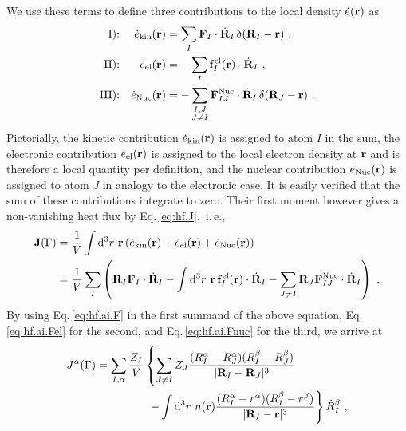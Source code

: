We use these terms to define three contributions to the local density $\dot{e} ({\bf r})$ as
\begin{subequations}
\begin{align}
	\text{I):}&&
		\dot{e}_{\rm kin} ({\bf r}) &= \sum_I {\bf F}_I \cdot \dot{{\bf R}}_I \, \delta ({\bf R}_I - {\bf r})~, \\
	\text{II):}&&
		\dot{e}_{\rm el} ({\bf r})  &= -\sum_{I} {\bf f}_I^{\rm el} ({\bf r}) \cdot \dot{{\bf R}}_I~, \\
	\text{III):}&&
		\dot{e}_{\rm Nuc} ({\bf r}) &= -\sum_{\substack{I, J \\ J \neq I}} {\bf F}^{\rm Nuc}_{IJ} \cdot \dot{{\bf R}}_I \, \delta ({\bf R}_J - {\bf r})~.
\end{align}
\label{eq:hf.ai.densities}
\end{subequations}
Pictorially, the kinetic contribution $\dot{e}_{\rm kin} ({\bf r})$ is assigned to atom $I$ in the sum, the electronic contribution $\dot{e}_{\rm el} ({\bf r})$ is assigned to the local electron density at ${\bf r}$ and is therefore a local quantity per definition, and the nuclear contribution $\dot{e}_{\rm Nuc} ({\bf r})$ is assigned to atom $J$ in analogy to the electronic case. It is easily verified that the sum of these contributions integrate to zero. Their first moment however gives a non-vanishing heat flux by Eq.\,\eqref{eq:hf.J},~i.\,e.,
\begin{align}
	{\bf J} (\Gamma)
		&= \frac{1}{V} \int {\rm d}^3 r ~ {\bf r} \left( \dot{e}_{\rm kin} ({\bf r}) + \dot{e}_{\rm el} ({\bf r}) + \dot{e}_{\rm Nuc} ({\bf r})  \right) \\
		&= \frac{1}{V} \sum_I
			\left( 
				{\bf R}_I {\bf F}_I \cdot \dot{{\bf R}}_I
				- \int {\rm d}^3 r ~ {\bf r} \, {\bf f}_I^{\rm el} ({\bf r}) \cdot \dot{{\bf R}}_I
				- \sum_{J \neq I} {\bf R}_J {\bf F}^{\rm Nuc}_{IJ} \cdot \dot{{\bf R}}_I
			\right)~.
\end{align}
By using Eq.\,\eqref{eq:hf.ai.F} in the first summand of the above equation, Eq.\,\eqref{eq:hf.ai.Fel} for the second, and Eq.\,\eqref{eq:hf.ai.Fnuc} for the third, we arrive at
\begin{align}
	J^\alpha (\Gamma) \nonumber
		=  \sum_{I, \alpha} \frac{Z_I}{V}
			&\left\{ 
				\sum_{J \neq I} Z_J \frac{(R_I^\alpha - R_J^\alpha) (R_I^\beta - R_J^\beta)}{\lvert \b R_I - \b R_J \rvert^3} \right. \nonumber \\
				&~\left.- \int \d^3 r ~ n(\b r) \frac{(R_I^\alpha - r^\alpha) (R_I^\beta - r^\beta)}{\lvert \b R_I - \b r \vert^3}
			\right\}
			\dot{R}^\beta_I~,
	\label{eq:hf.ai.J}
\end{align}
